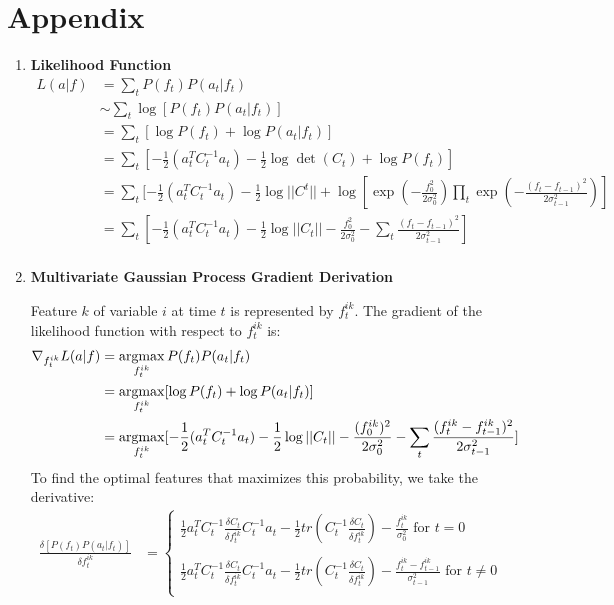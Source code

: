 \documentclass[12pt]{article}
\newcommand{\tr}{tr}
\newcommand{\argmax}{\operatornamewithlimits{argmax}}
\begin{document}
\newpage
\section{Appendix}
\begin{enumerate}
\item \textbf{Likelihood Function}
\begin{align*}
L(a|f)&= \sum_t P(f_t)P(a_t|f_t)\\
 &\sim \sum_t  \log [P(f_t)P(a_t|f_t)]\\
&=\sum_t[ \log P(f_t)+\log P(a_t|f_t)]\\
&=\sum_t [-\frac12(a_t^TC_t^{-1}a_t)-\frac12\log\det(C_t)+\log P(f_t)]\\
&=\sum_t [-\frac12 (a_t^TC_t^{-1}a_t)-\frac12\log||C^t||+\log[\exp(-\frac{f_0^2}{2\sigma_0^2})\prod_t\exp(-\frac{(f_t-f_{t-1})^2}{2\sigma_{t-1}^2})]\\
&=\sum_t[-\frac12 (a_t^TC_t^{-1}a_t)-\frac12\log||C_t||-\frac{f_0^2}{2\sigma_0^2}-\sum_t\frac{(f_t-f_{t-1})^2}{2\sigma_{t-1}^2}]\\
\end{align*}
\item \textbf{Multivariate Gaussian Process Gradient Derivation}\par
Feature $k$ of variable $i$ at time $t$ is represented by $f_t^{ik}$. The gradient of the likelihood function with respect to $f_t^{ik}$ is:
\begin{align*}
\nabla_{f_t^{ik}} L(a|f) &= \argmax_{f^{ik}_t} P(f_t)P(a_t|f_t) \\
&=\argmax_{f_t^{ik}} [\log P(f_t)+\log P(a_t|f_t)]\\
&=\argmax_{f_t^{ik}}[-\frac12 (a_t^TC_t^{-1}a_t)-\frac12\log||C_t||-\frac{(f_0^{ik})^2}{2\sigma_0^2}-\sum_t\frac{(f_t^{ik}-f^{ik}_{t-1})^2}{2\sigma_{t-1}^2}]
\end{align*}
\vspace{5mm}
To find the optimal features that maximizes this probability, we take the derivative:
\begin{align*}
\frac{\delta [P(f_t)P(a_t|f_t)]}{\delta f_{t}^{ik}}&=\begin{cases}
\frac12a_t^TC_t^{-1}\frac{\delta C_t}{\delta f_{t}^{ik}}C_t^{-1}a_t-\frac12 \tr(C_t^{-1}\frac{\delta C_t}{\delta f_{t}^{ik}})-\frac{f_{t}^{ik}}{\sigma_0^2} \text{ for } t=0\\
\\
 \frac12a_t^TC_t^{-1}\frac{\delta C_t}{\delta f_{t}^{ik}}C_t^{-1}a_t-\frac12 \tr(C_t^{-1}\frac{\delta C_t}{\delta f_{t}^{ik}})-\frac{f_{t}^{ik}-f_{t-1}^{ik}}{\sigma_{t-1}^2} \text{ for } t\neq0\\

\end{cases}
\end{align*}
\end{enumerate}
\end{document}
